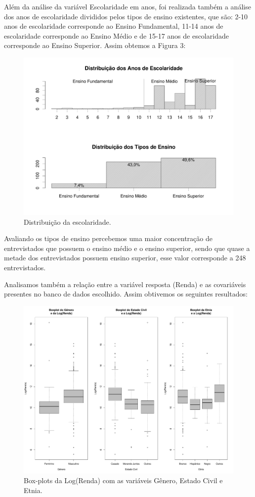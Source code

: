 \documentclass[]{article}
\begin{document}
Além da análise da variável Escolaridade em anos, foi realizada também a
análise dos anos de escolaridade divididos pelos tipos de ensino
existentes, que são: 2-10 anos de escolaridade corresponde ao Ensino
Fundamental, 11-14 anos de escolaridade corresponde ao Ensino Médio e de
15-17 anos de escolaridade corresponde ao Ensino Superior. Assim obtemos
a Figura 3:

\begin{figure}[H]

{\centering \includegraphics[width=0.6\linewidth]{p102-graf} 

}

\caption{Distribuição da escolaridade.}\label{fig:unnamed-chunk-10}
\end{figure}

Avaliando os tipos de ensino percebemos uma maior concentração de
entrevistados que possuem o ensino médio e o ensino superior, sendo que
quase a metade dos entrevistados possuem ensino superior, esse valor
corresponde a 248 entrevistados.

Analisamos também a relação entre a variável resposta (Renda) e as
covariáveis presentes no banco de dados escolhido. Assim obtivemos os
seguintes resultados:

\begin{figure}[H]

{\centering \includegraphics[width=0.8\linewidth]{p103-graf} 

}

\caption{Box-plots da Log(Renda) com as variáveis Gênero, Estado Civil e Etnia.}\label{fig:unnamed-chunk-11}
\end{figure}
\end{document}
